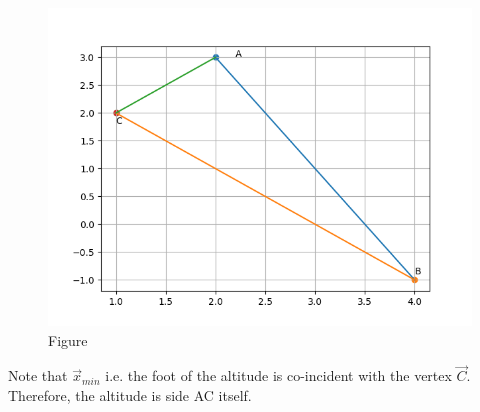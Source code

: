 \documentclass[journal,12pt,twocolumn]{IEEEtran}
\begin{document}
\begin{figure}[h!]
  \centering
   \includegraphics[width=\linewidth]{figs/figure_1.png}
   \caption{Figure}
   \label{fig:}
\end{figure}

Note that $\vec{x}_{min}$ i.e. the foot of the altitude is co-incident with the vertex $\vec{C}$. Therefore, the altitude is side AC itself.
\end{document}
